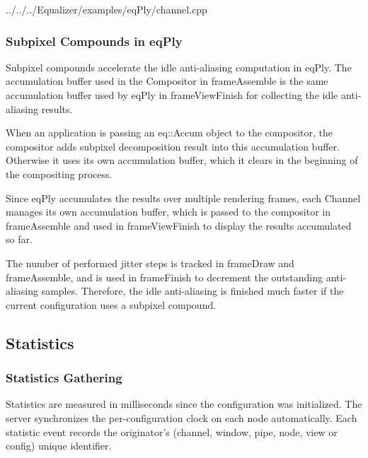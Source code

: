 \documentclass[10pt,a4]{scrartcl}
\begin{document}
{\footnotesize
  {../../../Equalizer/examples/eqPly/channel.cpp}}


\subsubsection{Subpixel Compounds in eqPly}

Subpixel compounds accelerate the idle anti-aliasing computation in eqPly. The
accumulation buffer used in the \textsf{Compositor} in \textsf{frameAssemble} is
the same accumulation buffer used by eqPly in \textsf{frameViewFinish} for
collecting the idle anti-aliasing results.

When an application is passing an \textsf{eq::Accum} object to the compositor,
the compositor adds subpixel decomposition result into this accumulation
buffer. Otherwise it uses its own accumulation buffer, which it clears in the
beginning of the compositing process.

Since \textsf{eqPly} accumulates the results over multiple rendering frames,
each \textsf{Channel} manages its own accumulation buffer, which is passed to
the compositor in \textsf{frameAssemble} and used in \textsf{frameViewFinish} to
display the results accumulated so far.

The number of performed jitter steps is tracked in \textsf{frameDraw} and
\textsf{frameAssemble}, and is used in \textsf{frameFinish} to decrement the
outstanding anti-aliasing samples. Therefore, the idle anti-aliasing is finished
much faster if the current configuration uses a subpixel compound.

\subsection{\label{sStatistics}Statistics}

\subsubsection{Statistics Gathering}

Statistics are measured in milliseconds since the configuration was
initialized. The server synchronizes the per-configuration clock on each node
automatically. Each statistic event records the originator's (channel, window,
pipe, node, view or config) unique identifier.
\end{document}
